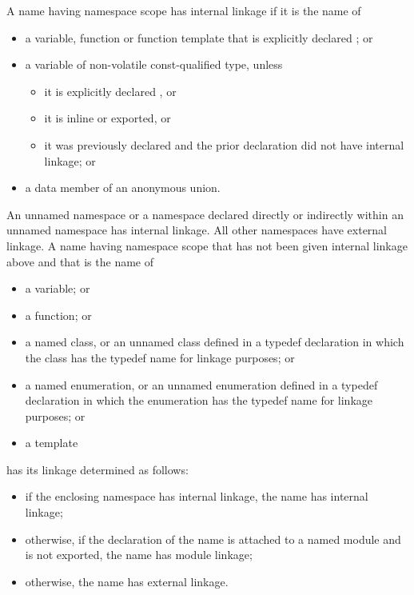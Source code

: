 \pnum
{}%
%
%
%
%
%
A name having namespace scope has internal
linkage if it is the name of
\begin{itemize}
\item
  a variable, function or function template that is
  explicitly declared ; or
\item
  a variable of non-volatile const-qualified type, unless
  \begin{itemize}
  \item it is explicitly declared , or
  \item it is inline or exported, or
  \item it was previously declared and the prior declaration did
  not have internal linkage; or
  \end{itemize}
\item
  a data member of an anonymous union.
\end{itemize}

\pnum
An unnamed namespace or a namespace declared directly or indirectly within an
unnamed namespace has internal linkage. All other namespaces have external linkage.
A name having namespace scope
that has not been given internal linkage above
and that is the name of
\begin{itemize}
\item a variable; or
\item a function; or
\item {}%
a named class, or an unnamed class defined in a
typedef declaration in which the class has the typedef name for linkage
purposes; or
\item {}%
a named enumeration, or an unnamed enumeration defined
in a typedef declaration in which the enumeration has the typedef name
for linkage purposes; or
\item a template
\end{itemize}
has its linkage determined as follows:
\begin{itemize}
\item
if the enclosing namespace has internal linkage,
the name has internal linkage;
\item
otherwise,
if the declaration of the name is
attached to a named module
and is not exported,
the name has module linkage;
\item
otherwise,
the name has external linkage.
\end{itemize}

